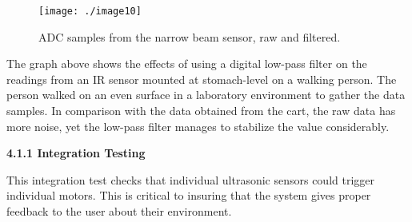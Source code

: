 \begin{figure}[h]
\texttt{[image: ./image10]}
\caption{ ADC samples from the narrow beam sensor, raw and filtered.}
\label{figure:caseStudyAdcSamples}
\end{figure}

The graph above shows the effects of using a digital low-pass filter on
the readings from an IR sensor mounted at stomach-level on a walking
person. The person walked on an even surface in a laboratory environment
to gather the data samples. In comparison with the data obtained from
the cart, the raw data has more noise, yet the low-pass filter manages
to stabilize the value considerably.




\textbf{4.1.1 Integration Testing}

This integration test checks that individual ultrasonic sensors could
trigger individual motors. This is critical to insuring that the system
gives proper feedback to the user about their environment.


